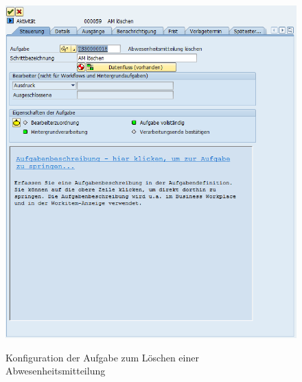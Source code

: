 \begin{figure}[H]
	\begin{center}
	\includegraphics[width=1.0\textwidth]{grafiken/wf-builder_bsp2_act_am-loeschen.png}
	\caption{Konfiguration der Aufgabe zum Löschen einer Abwesenheitsmitteilung}
	\vspace{-10pt}
	\label{abb:workflow-bsp2-act_am-loeschen}
	\end{center}
\end{figure}

